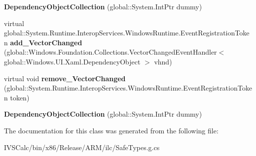 \begin{DoxyCompactItemize}
\item 
\mbox{\label{class_windows_1_1_u_i_1_1_xaml_1_1_dependency_object_collection_aae876d96e705148d2425bda950792fb8}} 
{\bfseries Dependency\+Object\+Collection} (global\+::\+System.\+Int\+Ptr dummy)
\item 
\mbox{\label{class_windows_1_1_u_i_1_1_xaml_1_1_dependency_object_collection_a4891caca0ff7188ffc71a5e248053e6d}} 
virtual global\+::\+System.\+Runtime.\+Interop\+Services.\+Windows\+Runtime.\+Event\+Registration\+Token {\bfseries add\+\_\+\+Vector\+Changed} (global\+::\+Windows.\+Foundation.\+Collections.\+Vector\+Changed\+Event\+Handler$<$ global\+::\+Windows.\+U\+I.\+Xaml.\+Dependency\+Object $>$ vhnd)
\item 
\mbox{\label{class_windows_1_1_u_i_1_1_xaml_1_1_dependency_object_collection_a940ed4f33f8d86b62b76cddcdf7bdc55}} 
virtual void {\bfseries remove\+\_\+\+Vector\+Changed} (global\+::\+System.\+Runtime.\+Interop\+Services.\+Windows\+Runtime.\+Event\+Registration\+Token token)
\item 
\mbox{\label{class_windows_1_1_u_i_1_1_xaml_1_1_dependency_object_collection_aae876d96e705148d2425bda950792fb8}} 
{\bfseries Dependency\+Object\+Collection} (global\+::\+System.\+Int\+Ptr dummy)
\end{DoxyCompactItemize}


The documentation for this class was generated from the following file\+:\begin{DoxyCompactItemize}
\item 
I\+V\+S\+Calc/bin/x86/\+Release/\+A\+R\+M/ilc/Safe\+Types.\+g.\+cs\end{DoxyCompactItemize}
